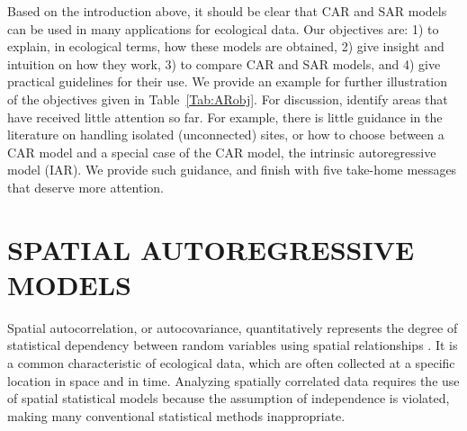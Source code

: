 \documentclass[11pt, titlepage]{article}\usepackage[]{graphicx}\usepackage[]{color}
\begin{document}
Based on the introduction above, it should be clear that CAR and SAR models can be used in many applications for ecological data.  Our objectives are: 1) to explain, in ecological terms, how these models are obtained, 2) give insight and intuition on how they work, 3) to compare CAR and SAR models, and 4) give practical guidelines for their use. We provide an example for further illustration of the objectives given in Table~\ref{Tab:ARobj}. For discussion, identify areas that have received little attention so far.  For example, there is little guidance in the literature on handling isolated (unconnected) sites, or how to choose between a CAR model and a special case of the CAR model, the intrinsic autoregressive model (IAR).  We provide such guidance, and finish with five take-home messages that deserve more attention.
 


\section*{SPATIAL AUTOREGRESSIVE MODELS}

Spatial autocorrelation, or autocovariance, quantitatively represents the degree of statistical dependency between random variables using spatial relationships \citep{Cres:stat:1993}. It is a common characteristic of ecological data, which are often collected at a specific location in space and in time.  Analyzing spatially correlated data requires the use of spatial statistical models because the assumption of independence is violated, making many conventional statistical methods inappropriate.
\end{document}
